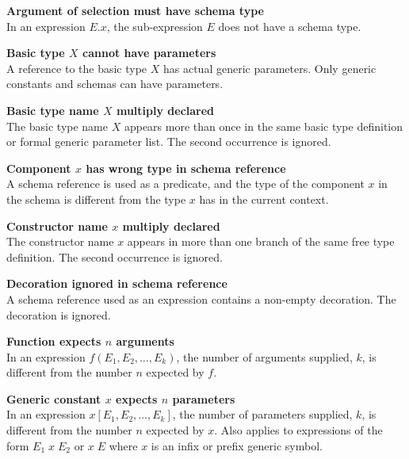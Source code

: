 {{{{{{\begin{trivlist}
\item[]{\bf Argument of selection must have schema type}\\
        In an expression $E.x$, the sub-expression $E$ does not have a
        schema type. 

\item[]{\bf Basic type $X$ cannot have parameters}\\
        A reference to the basic type $X$ has actual generic
        parameters. Only generic constants and schemas can have
        parameters. 

\item[]{\bf Basic type name $X$ multiply declared}\\
        The basic type name $X$ appears more than once in the same
        basic type definition or formal generic parameter list. The
        second occurrence is ignored.

\item[]{\bf Component $x$ has wrong type in schema reference}\\
        A schema reference is used as a predicate, and the type of
        the component $x$ in the schema is different from the type
        $x$ has in the current context.  

\item[]{\bf Constructor name $x$ multiply declared}\\
        The constructor name $x$ appears in more than one branch of
        the same free type definition.  The second occurrence is
        ignored.  

\item[]{\bf Decoration ignored in schema reference}\\
        A schema reference used as an expression contains a non-empty
        decoration. The decoration is ignored. 

\item[]{\bf Function expects $n$ arguments}\\
        In an expression $f(E_1, E_2, \ldots, E_k)$, the number of
        arguments supplied, $k$, is different from the number $n$ expected
        by $f$. 

\item[]{\bf Generic constant $x$ expects $n$ parameters}\\
        In an expression $x[E_1, E_2, \ldots, E_k]$, the number of
        parameters supplied, $k$, is different from the number $n$ expected
        by $x$. Also applies to expressions of the form $E_1\;x\;E_2$
        or $x\;E$ where $x$ is an infix or prefix generic symbol.


\end{trivlist}}}}}}}

